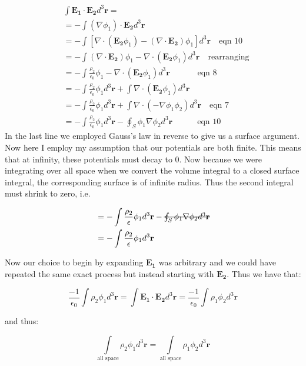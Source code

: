 \documentclass[a4paper, 11pt]{article}
\begin{document}
\begin{align*}
	&\int \mathbf{E_1} \cdot \mathbf{E_2}  d^3\mathbf{r} = \\ 
	&= - \int (\nabla \phi_1) \cdot \mathbf{E_2} d^3\mathbf{r} \\ 
	&= - \int [\nabla \cdot (\mathbf{E_2}\phi_1)-(\nabla \cdot \mathbf{E_2})\phi_1] d^3\mathbf{r} \quad \mbox{eqn 10} \\ 
	&= - \int (\nabla \cdot \mathbf{E_2})\phi_1 - \nabla \cdot (\mathbf{E_2}\phi_1) d^3\mathbf{r} \quad \mbox{rearranging}\\ 
	&= -\int \frac{\rho_2}{\epsilon_0}\phi_1 - \nabla \cdot (\mathbf{E_2}\phi_1) d^3\mathbf{r}  \quad \quad \quad \mbox{ eqn 8}\\ 
	&= - \int \frac{\rho_2}{\epsilon_0}\phi_1 d^3\mathbf{r} + \int \nabla \cdot (\mathbf{E_2}\phi_1) d^3 \mathbf{r} \\
	&= - \int \frac{\rho_2}{\epsilon_0}\phi_1 d^3\mathbf{r} + \int \nabla \cdot (-\nabla \phi_1 \phi_2) d^3\mathbf{r} \quad \mbox{eqn 7} \\ 
	&= -\int \frac{\rho_2}{\epsilon_0}\phi_1d^3\mathbf{r} - \oint_S \phi_1 \nabla\phi_2 d^3\mathbf{r} \quad \quad \quad \mbox{eqn 10}
\end{align*}
In the last line we employed Gauss's law in reverse to give us a surface argument. Now here I employ my assumption that our potentials are both finite. This means that at infinity, these potentials must decay to 0. Now because we were integrating over all space when we convert the volume integral to a closed surface integral, the corresponding surface is of infinite radius. Thus the second integral must shrink to zero, i.e. 

\begin{align*}
	&= -\int \frac{\rho_2}{\epsilon}\phi_1 d^3\mathbf{r} - \mbox{\sout{$\oint_S \phi_1 \nabla\phi_2 d^3\mathbf{r}$}} \\ 
	&= -\int \frac{\rho_2}{\epsilon}\phi_1 d^3\mathbf{r} 
\end{align*} 

Now our choice to begin by expanding $\mathbf{E_1}$ was arbitrary and we could have repeated the same exact process but instead starting with $\mathbf{E_2}$. Thus we have that: 

\begin{equation}
	\frac{-1}{\epsilon_0} \int \rho_2 \phi_1 d^3\mathbf{r} = \int \mathbf{E_1} \cdot \mathbf{E_2} d^3\mathbf{r} = \frac{-1}{\epsilon_0} \int \rho_1 \phi_2 d^3\mathbf{r} 
\end{equation}

and thus: 

\begin{equation}
	\int\limits_{\mbox{all space}} \rho_2 \phi_1 d^3\mathbf{r} = \int\limits_{\mbox{all space}} \rho_1 \phi_2 d^3\mathbf{r} 
\end{equation}
\end{document}
